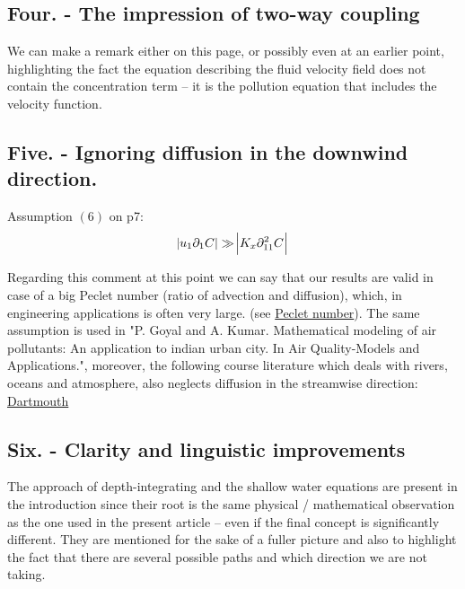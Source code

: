 \documentclass{article}
\begin{document}
\subsection{Four. - The impression of two-way coupling}

We can make a remark either on this page, or possibly even at an earlier point, highlighting the fact the equation describing the fluid velocity field does not contain the concentration term -- it is the pollution equation that includes the velocity function.

\subsection{Five. - Ignoring diffusion in the downwind direction.}

Assumption $(6)$ on p7:
\begin{equation} \abs{u_1 \partial_{1} C} \gg \abs{ K_x \partial_{11} ^2 C }\end{equation}

Regarding this comment at this point we can say that our results are valid in case of a big Peclet number (ratio of advection and diffusion), which, in engineering applications is often very large. (see \href{https://en.wikipedia.org/wiki/Peclet_number}{Peclet number}). The same assumption is used in "P. Goyal and A. Kumar. Mathematical modeling of air pollutants: An application to indian urban city. In Air Quality-Models and Applications.", moreover, the following course literature which deals with rivers, oceans and atmosphere, also neglects diffusion in the streamwise direction: \href{http://www.dartmouth.edu/~cushman/courses/engs43/Chapter3.pdf}{Dartmouth}

\subsection{Six. - Clarity and linguistic improvements}

The approach of depth-integrating and the shallow water equations are present in the introduction since their root is the same physical / mathematical observation as the one used in the present article -- even if the final concept is significantly different. They are mentioned for the sake of a fuller picture and also to highlight the fact that there are several possible paths and which direction we are not taking.
\end{document}
